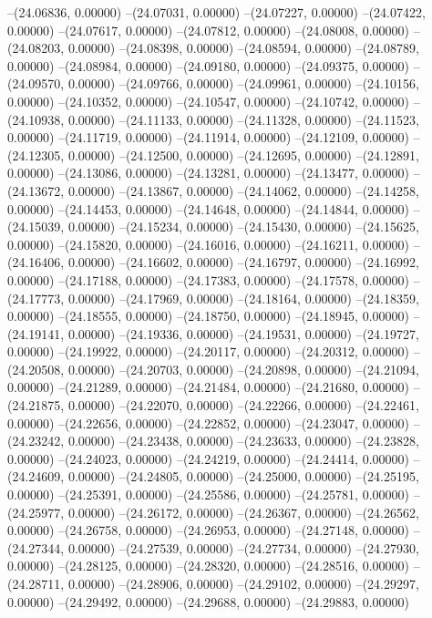 --(24.06836, 0.00000)
--(24.07031, 0.00000)
--(24.07227, 0.00000)
--(24.07422, 0.00000)
--(24.07617, 0.00000)
--(24.07812, 0.00000)
--(24.08008, 0.00000)
--(24.08203, 0.00000)
--(24.08398, 0.00000)
--(24.08594, 0.00000)
--(24.08789, 0.00000)
--(24.08984, 0.00000)
--(24.09180, 0.00000)
--(24.09375, 0.00000)
--(24.09570, 0.00000)
--(24.09766, 0.00000)
--(24.09961, 0.00000)
--(24.10156, 0.00000)
--(24.10352, 0.00000)
--(24.10547, 0.00000)
--(24.10742, 0.00000)
--(24.10938, 0.00000)
--(24.11133, 0.00000)
--(24.11328, 0.00000)
--(24.11523, 0.00000)
--(24.11719, 0.00000)
--(24.11914, 0.00000)
--(24.12109, 0.00000)
--(24.12305, 0.00000)
--(24.12500, 0.00000)
--(24.12695, 0.00000)
--(24.12891, 0.00000)
--(24.13086, 0.00000)
--(24.13281, 0.00000)
--(24.13477, 0.00000)
--(24.13672, 0.00000)
--(24.13867, 0.00000)
--(24.14062, 0.00000)
--(24.14258, 0.00000)
--(24.14453, 0.00000)
--(24.14648, 0.00000)
--(24.14844, 0.00000)
--(24.15039, 0.00000)
--(24.15234, 0.00000)
--(24.15430, 0.00000)
--(24.15625, 0.00000)
--(24.15820, 0.00000)
--(24.16016, 0.00000)
--(24.16211, 0.00000)
--(24.16406, 0.00000)
--(24.16602, 0.00000)
--(24.16797, 0.00000)
--(24.16992, 0.00000)
--(24.17188, 0.00000)
--(24.17383, 0.00000)
--(24.17578, 0.00000)
--(24.17773, 0.00000)
--(24.17969, 0.00000)
--(24.18164, 0.00000)
--(24.18359, 0.00000)
--(24.18555, 0.00000)
--(24.18750, 0.00000)
--(24.18945, 0.00000)
--(24.19141, 0.00000)
--(24.19336, 0.00000)
--(24.19531, 0.00000)
--(24.19727, 0.00000)
--(24.19922, 0.00000)
--(24.20117, 0.00000)
--(24.20312, 0.00000)
--(24.20508, 0.00000)
--(24.20703, 0.00000)
--(24.20898, 0.00000)
--(24.21094, 0.00000)
--(24.21289, 0.00000)
--(24.21484, 0.00000)
--(24.21680, 0.00000)
--(24.21875, 0.00000)
--(24.22070, 0.00000)
--(24.22266, 0.00000)
--(24.22461, 0.00000)
--(24.22656, 0.00000)
--(24.22852, 0.00000)
--(24.23047, 0.00000)
--(24.23242, 0.00000)
--(24.23438, 0.00000)
--(24.23633, 0.00000)
--(24.23828, 0.00000)
--(24.24023, 0.00000)
--(24.24219, 0.00000)
--(24.24414, 0.00000)
--(24.24609, 0.00000)
--(24.24805, 0.00000)
--(24.25000, 0.00000)
--(24.25195, 0.00000)
--(24.25391, 0.00000)
--(24.25586, 0.00000)
--(24.25781, 0.00000)
--(24.25977, 0.00000)
--(24.26172, 0.00000)
--(24.26367, 0.00000)
--(24.26562, 0.00000)
--(24.26758, 0.00000)
--(24.26953, 0.00000)
--(24.27148, 0.00000)
--(24.27344, 0.00000)
--(24.27539, 0.00000)
--(24.27734, 0.00000)
--(24.27930, 0.00000)
--(24.28125, 0.00000)
--(24.28320, 0.00000)
--(24.28516, 0.00000)
--(24.28711, 0.00000)
--(24.28906, 0.00000)
--(24.29102, 0.00000)
--(24.29297, 0.00000)
--(24.29492, 0.00000)
--(24.29688, 0.00000)
--(24.29883, 0.00000)
